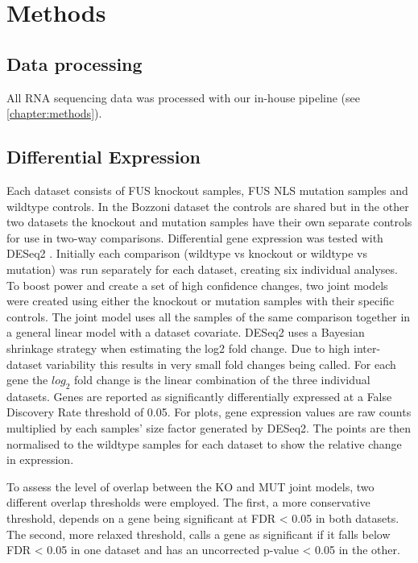 \section{Methods}

\subsection{Data processing}
All RNA sequencing data was processed with our in-house pipeline (see \autoref{chapter:methods}).

\subsection{Differential Expression}
 Each dataset consists of FUS knockout samples, FUS NLS mutation samples and wildtype controls.
In the Bozzoni dataset the controls are shared but in the other two datasets the knockout and mutation samples have their own separate controls for use in two-way comparisons.
Differential gene expression was tested with DESeq2 \citep{Love2014}.
Initially each comparison (wildtype vs knockout or wildtype vs mutation) was run separately for each dataset, creating six individual analyses.
To boost power and create a set of high confidence changes, two joint models were created using either the knockout or mutation samples with their specific controls.
The joint model uses all the samples of the same comparison together in a general linear model with a dataset covariate. 
DESeq2 uses a Bayesian shrinkage strategy when estimating the log2 fold change. Due to high inter-dataset variability this results in very small fold changes being called.
For each gene the $log_2$ fold change is the linear combination of the three individual datasets.
Genes are reported as significantly differentially expressed at a False Discovery Rate threshold of 0.05. 
For plots, gene expression values are  raw counts multiplied by each samples’ size factor generated by DESeq2. 
The points are then normalised to the wildtype samples for each dataset to show the relative change in expression.

To assess the level of overlap between the KO and MUT joint models, two different overlap thresholds were employed.
The first, a more conservative threshold, depends on a gene being significant at FDR < 0.05 in both datasets.
The second, more relaxed threshold, calls a gene as significant if it falls below FDR < 0.05 in one dataset and has an uncorrected p-value < 0.05 in the other.


